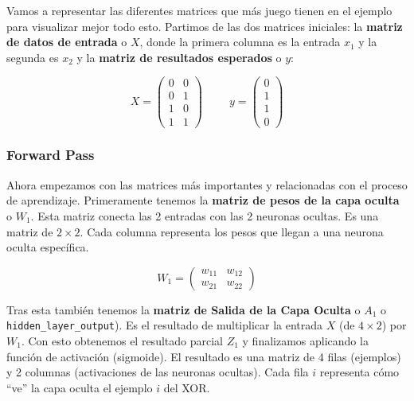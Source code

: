 \documentclass[a4paper,11pt]{article}
\renewenvironment{equation}{\begin{equation*}}{\end{equation*}}
\let\oldequation\equation
\let\endoldequation\endequation
\renewenvironment{equation}
  {\vspace{0.5em}\oldequation}
  {\endoldequation\vspace{0.5em}}
\begin{document}
Vamos a representar las diferentes matrices que más juego tienen en el
ejemplo para visualizar mejor todo esto. Partimos de las dos matrices
iniciales: la \textbf{matriz de datos de entrada} o \(X\), donde la
primera columna es la entrada \(x_1\) y la segunda es \(x_2\) y la
\textbf{matriz de resultados esperados} o \(y\):

\begin{equation}X = \begin{pmatrix} 0 & 0 \\ 0 & 1 \\ 1 & 0 \\ 1 & 1 \end{pmatrix} \hspace{1cm} y = \begin{pmatrix} 0 \\ 1 \\ 1 \\ 0 \end{pmatrix}\end{equation}



\subsubsection{Forward Pass}

Ahora empezamos con las matrices más importantes y relacionadas con el
proceso de aprendizaje. Primeramente tenemos la \textbf{matriz de pesos
de la capa oculta} o \(W_1\). Esta matriz conecta las 2 entradas con las
2 neuronas ocultas. Es una matriz de \(2 \times 2\). Cada columna
representa los pesos que llegan a una neurona oculta específica.

\begin{equation}
W_1 = \begin{pmatrix} w_{11} & w_{12} \\ w_{21} & w_{22} \end{pmatrix}
\end{equation}

Tras esta también tenemos la \textbf{matriz de Salida de la Capa Oculta}
o \(A_1\) o \texttt{hidden\_layer\_output}). Es el resultado de
multiplicar la entrada \(X\) (de \(4 \times 2\)) por \(W_1\). Con esto
obtenemos el resultado parcial \(Z_1\) y finalizamos aplicando la
función de activación (sigmoide). El resultado es una matriz de 4 filas
(ejemplos) y 2 columnas (activaciones de las neuronas ocultas). Cada
fila \(i\) representa cómo ``ve'' la capa oculta el ejemplo \(i\) del
XOR.
\end{document}
